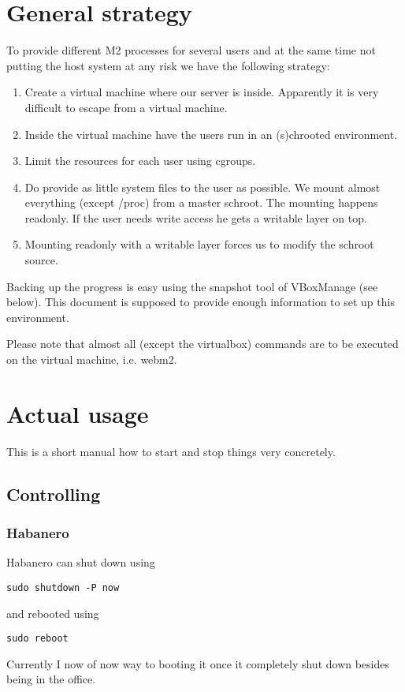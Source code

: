 \documentclass[a4paper]{book}
\begin{document}
\tableofcontents
\chapter{General strategy}
To provide different M2 processes for several users and at the same time not putting the host system at any risk we have the following strategy:
\begin{enumerate}
\item Create a virtual machine where our server is inside. Apparently it is very difficult to escape from a virtual machine.
\item Inside the virtual machine have the users run in an (s)chrooted environment.
\item Limit the resources for each user using cgroups.
\item Do provide as little system files to the user as possible. We mount almost everything (except /proc) from a master schroot. The mounting happens readonly. If the user needs write access he gets a writable layer on top.
\item Mounting readonly with a writable layer forces us to modify the schroot source.
\end{enumerate}
Backing up the progress is easy using the snapshot tool of VBoxManage (see below). This document is supposed to provide enough information to set up this environment.

Please note that almost all (except the virtualbox) commands are to be executed on the virtual machine, i.e. webm2.

\chapter{Actual usage}
This is a short manual how to start and stop things very concretely.
\section{Controlling}
\subsection{Habanero}
Habanero can shut down using
\begin{verbatim}
sudo shutdown -P now
\end{verbatim}
and rebooted using
\begin{verbatim}
sudo reboot
\end{verbatim}
Currently I now of now way to booting it once it completely shut down besides being in the office.
\end{document}
